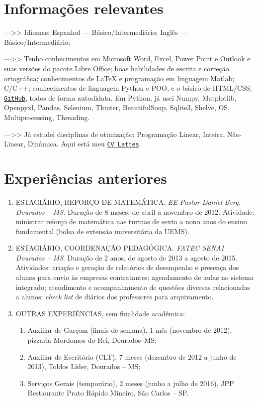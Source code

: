\documentclass[11pt]{article}
\begin{document}
\section{Informações relevantes \dotfill}
--->> Idiomas: Espanhol --- Básico/Intermediário; Inglês --- Básico/Intermediário;

\noindent 
--->> Tenho conhecimentos em Microsoft Word, Excel, Power Point e Outlook e suas versões do pacote Libre Office; boas habilidades de escrita e correção ortográfica; conhecimentos de LaTeX e programação em linguagem Matlab; C/C++; conhecimentos de linguagem Python e POO, e o básico de HTML/CSS, \href{https://github.com/j5r}{\texttt{GitHub}}, todos de forma autodidata. Em Python, já usei Numpy, Matplotlib, Openpyxl, Pandas, Selenium, Tkinter, BeautifulSoup, Sqlite3, Shelve, OS, Multiprocessing, Threading.

\noindent
--->> Já estudei disciplinas de otimização: Programação Linear, Inteira, Não-Linear, Dinâmica. 
Aqui está meu \href{http://lattes.cnpq.br/3866983332299702}{\texttt{CV Lattes}}.
\thispagestyle{empty}


\section{Experiências anteriores \dotfill}

\begin{enumerate}
\item ESTAGIÁRIO, REFORÇO DE MATEMÁTICA, \textit{EE Pastor Daniel Berg. Dourados -- MS.} Duração de 8 meses, de abril a novembro de 2012. Atividade: ministrar reforço de matemática nas turmas de sexto a nono anos do ensino fundamental (bolsa de extensão universitária da UEMS).

\item ESTAGIÁRIO, COORDENAÇÃO PEDAGÓGICA. {\it FATEC SENAI Dourados -- MS}. Duração de 2 anos, de agosto de 2013 a agosto de 2015. Atividades: criação e geração de relatórios de desempenho e presença dos alunos para envio às empresas contratantes; agendamento de aulas no sistema integrado; atendimento e acompanhamento de questões diversas relacionadas a alunos; {\it check list} de diários dos professores para arquivamento. 


\item OUTRAS EXPERIÊNCIAS, sem finalidade acadêmica:
\begin{enumerate}
\item  Auxiliar de Garçom (finais de semana), 1 mês (novembro de 2012), pizzaria Mordomos do Rei, Dourados--MS;
\item Auxiliar de Escritório (CLT), 7 meses (dezembro de 2012 a junho de 2013), Toldos Líder, Dourados -- MS;
\item  Serviços Gerais (temporário), 2 meses (junho a julho de 2016), JPP Restaurante Prato Rápido Mineiro, São Carlos -- SP.
\end{enumerate}
\end{enumerate}
\end{document}
